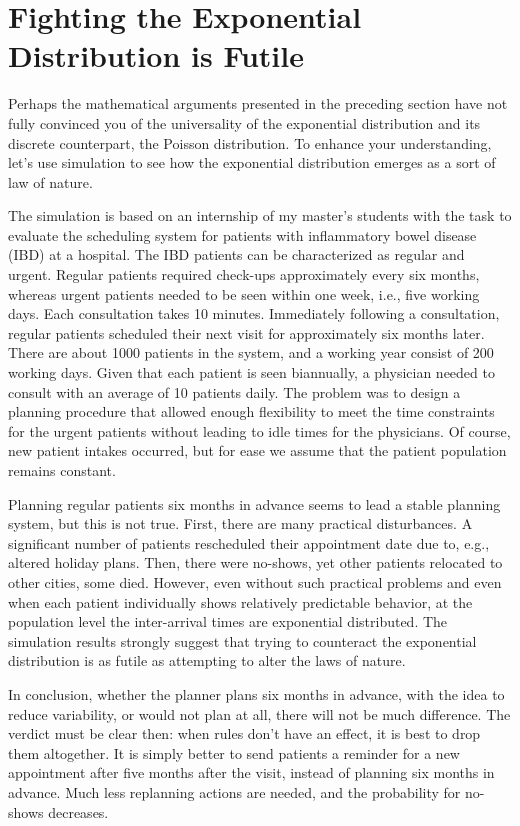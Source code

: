 \documentclass[queueing-book.tex]{subfiles}
\begin{document}
\section{Fighting the Exponential Distribution is Futile}

Perhaps the mathematical arguments presented in the preceding section have not fully convinced you of the universality of the exponential distribution and its discrete counterpart, the Poisson distribution.
To enhance your understanding, let's use simulation to see how the exponential distribution emerges as a sort of law of nature.

The simulation is based on an internship of my master's students with the task to evaluate the scheduling system for patients with inflammatory bowel disease (IBD) at a hospital.
The IBD patients can be characterized as regular and urgent.
Regular patients required check-ups approximately every six months, whereas urgent patients needed to be seen within one week, i.e., five working days.
Each consultation takes 10 minutes.
Immediately following a consultation, regular patients scheduled their next visit for approximately six months later.
There are about 1000 patients in the system, and a working year consist of 200 working days.
Given that each patient is seen biannually, a physician needed to consult with an average of 10 patients daily.
The problem was to design a planning procedure that allowed enough flexibility to meet the time constraints for the urgent patients without leading to idle times for the physicians.
Of course, new patient intakes occurred, but for ease we assume that the patient population remains constant.

Planning regular patients six months in advance seems to lead a stable planning system, but this is not true.
First, there are many practical disturbances.
A significant number of patients rescheduled their appointment date due to, e.g., altered holiday plans.
Then, there were no-shows, yet other patients relocated to other cities, some died.
However, even without such practical problems and even when each patient individually shows relatively predictable behavior, at the population level the inter-arrival times are exponential distributed.
The simulation results strongly suggest that trying to counteract the exponential distribution is as futile as attempting to alter the laws of nature.

In conclusion, whether the planner plans six months in advance, with the idea to reduce variability, or would not plan at all, there will not be much difference.
The verdict must be clear then: when rules don't have an effect, it is best to drop them altogether.
It is simply better to send patients a reminder for a new appointment after five months after the visit, instead of planning six months in advance.
Much less replanning actions are needed, and the probability for no-shows decreases.
\end{document}

